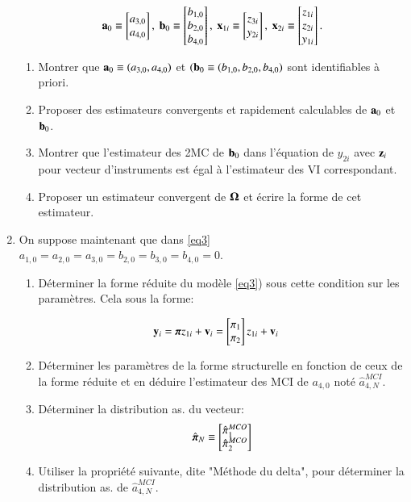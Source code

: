 \begin{enumerate}
 \[
 \bolda_0 \equiv \begin{bmatrix}
    a_{3, 0}\\
    a_{4, 0}
 \end{bmatrix}
, \ 
\boldb_0 \equiv \begin{bmatrix}
    b_{1, 0}\\
    b_{2, 0}\\
    b_{4, 0}
 \end{bmatrix}
 , \ 
 \boldx_{1i} \equiv \begin{bmatrix}
    z_{3i}\\
    y_{2i}
 \end{bmatrix}
 , \ 
 \boldx_{2i} \equiv \begin{bmatrix}
    z_{1i}\\
    z_{2i}\\
    y_{1i}
 \end{bmatrix}.
 \]
 \begin{enumerate}
\item Montrer que ${\mathbf a}_0 \equiv (a_{3,0}, a_{4,0})$ et $({\mathbf b}_0 \equiv(b_{1,0},b_{2,0}, b_{4,0})$ sont 
identifiables à priori.
\item Proposer des estimateurs convergents et rapidement calculables de ${\mathbf a}_0$ et ${\mathbf b}_0$.
\item Montrer que l’estimateur des 2MC de ${\mathbf b}_0$ dans l’équation de $y_{2i}$ 
avec ${\mathbf z}_i$ pour vecteur d’instruments est égal à l’estimateur des VI correspondant. 
\item Proposer un estimateur convergent de ${\boldsymbol \Omega}$ et écrire la forme de cet estimateur.
 \end{enumerate}
 \item On suppose maintenant que dans \eqref{eq3} $a_{1,0} = a_{2,0}= a_{3,0}= b_{2,0}= b_{3,0}= b_{4,0}=0$.
\begin{enumerate}
\item Déterminer la forme réduite du modèle \eqref{eq3}) sous cette condition sur les paramètres. Cela sous la forme: 

\begin{align*}
 {\mathbf y}_i &= {\boldsymbol \pi} z_{1i} + {\mathbf v}_i = \begin{bmatrix}
     \pi_1\\
     \pi_2
 \end{bmatrix}
 z_{1i}+ {\mathbf v}_i
\end{align*}
\item Déterminer les paramètres de la forme structurelle en fonction de ceux de la forme réduite 
et en déduire l’estimateur des MCI de $a_{4, 0}$ noté $\hat{a}_{4, N}^{MCI}$.
\item Déterminer la distribution as. du vecteur:
\[\hat{{\boldsymbol \pi}}_N \equiv
    \begin{bmatrix}
        \hat{\pi}_1^{MCO}\\
        \hat{\pi}_2^{MCO}
    \end{bmatrix}
    \]
    \item Utiliser la propriété suivante, dite "Méthode du delta", pour déterminer la distribution as. de
    $\hat{a}_{4, N}^{MCI}$.


\end{enumerate}
\end{enumerate}
